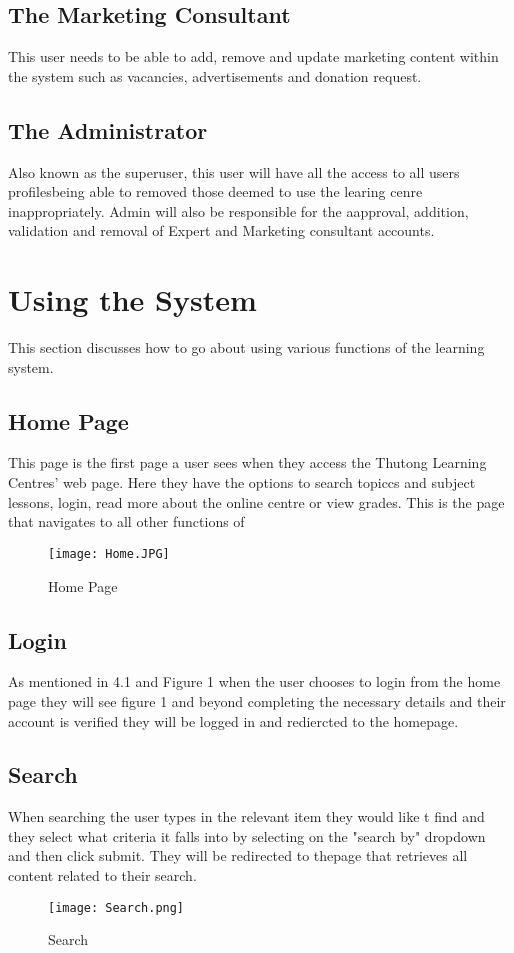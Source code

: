 \documentclass[12pt,a4paper]{article}
\begin{document}
		\subsection{The Marketing Consultant}
		 This user needs to be able to add, remove and update marketing content within the system such as vacancies, advertisements and donation request.
		 
		 
		 \subsection{The Administrator}
		 Also known as the superuser, this user will have all the access to all users profilesbeing able to removed those deemed to use the learing cenre inappropriately. Admin will also be responsible for the aapproval, addition, validation and removal of Expert and Marketing consultant accounts.
		 
	\section{Using the System}
	 This section discusses how to go about using various functions of the learning system.
	 	\subsection{Home Page}
		This page is the first page a user sees when they access the Thutong Learning Centres' web page. Here they have the options to search topiccs and subject lessons, login, read more about the online centre or view grades. This is the page that navigates to all other functions of 
		
		\begin{figure}
		 	\texttt{[image: Home.JPG]}
		 	\caption{Home Page}
		 	\label{fig: Home Page}
		 \end{figure}
		 
	 	\subsection{Login}
	 	 As mentioned in 4.1 and Figure 1 when the user chooses to login from the home page they will see figure 1 and beyond completing the necessary details and their account is verified they will be logged in and rediercted to the homepage. 
	 	 
	 	 \subsection{Search}
	 	 When searching the user types in the relevant item they would like t find and they select what criteria it falls into  by selecting on the "search by" dropdown and then click submit. They will be redirected to thepage that retrieves all content related to their search.
		  \begin{figure}
		 	\texttt{[image: Search.png]}
		 	\caption{Search}
		 	\label{fig: Search}
		 \end{figure}
	 	
\end{document}
